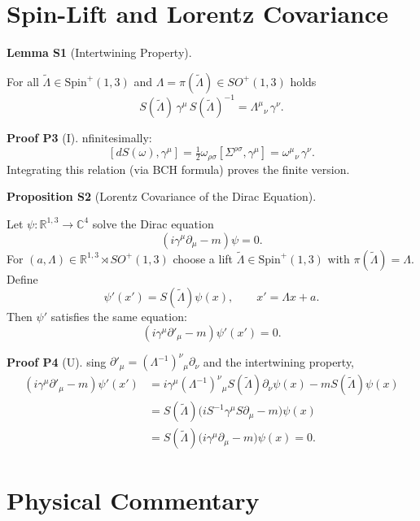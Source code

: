 \documentclass[10pt, letterpaper]{article}
\newcommand{\R}{\mathbb{R}}
\newcommand{\C}{\mathbb{C}}
\newcommand{\Spin}{\mathrm{Spin}}
\newcommand{\CustomHeading}[3]{%
  \par\medskip\noindent%
  \textbf{#1 #2} \textnormal{(#3)}.\enskip%
}
\newenvironment{PROP}[2]{\begin{unitbox}\CustomHeading{Proposition}{#1}{#2}}{\end{unitbox}}
\newenvironment{LEM}[2]{\begin{unitbox}\CustomHeading{Lemma}{#1}{#2}}{\end{unitbox}}
\newenvironment{PROOF}[2]{\begin{unitbox}\CustomHeading{Proof}{#1}{#2}}{\end{unitbox}}
\begin{document}
\section{Spin-Lift and Lorentz Covariance}

\begin{LEM}{S1}{Intertwining Property}
For all $\widetilde\Lambda\in \Spin^+(1,3)$ and $\Lambda=\pi(\widetilde\Lambda)\in SO^+(1,3)$ holds
\[
S(\widetilde\Lambda)\,\gamma^\mu\,S(\widetilde\Lambda)^{-1}
= \Lambda^\mu{}_\nu\,\gamma^\nu.
\]
\end{LEM}

\begin{PROOF}{P3}
Infinitesimally:
\[
[dS(\omega),\gamma^\mu]
= \tfrac12\omega_{\rho\sigma}[\Sigma^{\rho\sigma},\gamma^\mu]
= \omega^\mu{}_\nu\,\gamma^\nu.
\]
Integrating this relation (via BCH formula) proves the finite version.
\end{PROOF}

\begin{PROP}{S2}{Lorentz Covariance of the Dirac Equation}
Let $\psi:\R^{1,3}\to\C^4$ solve the Dirac equation
\[
(i\gamma^\mu\partial_\mu - m)\psi = 0.
\]
For $(a,\Lambda)\in \R^{1,3}\rtimes SO^+(1,3)$ choose a lift $\widetilde\Lambda\in\Spin^+(1,3)$ with $\pi(\widetilde\Lambda)=\Lambda$.  
Define
\[
\psi'(x') = S(\widetilde\Lambda)\psi(x),\qquad x'=\Lambda x + a.
\]
Then $\psi'$ satisfies the same equation:
\[
(i\gamma^\mu\partial'_\mu - m)\psi'(x')=0.
\]
\end{PROP}

\begin{PROOF}{P4}
Using $\partial'_\mu=(\Lambda^{-1})^\nu{}_\mu\partial_\nu$ and the intertwining property,
\[
\begin{aligned}
(i\gamma^\mu\partial'_\mu - m)\psi'(x')
&= i\gamma^\mu(\Lambda^{-1})^\nu{}_\mu S(\widetilde\Lambda)\partial_\nu\psi(x) - mS(\widetilde\Lambda)\psi(x)\\
&= S(\widetilde\Lambda)\big(iS^{-1}\gamma^\mu S\partial_\mu - m\big)\psi(x)\\
&= S(\widetilde\Lambda)\big(i\gamma^\mu\partial_\mu - m\big)\psi(x)=0.
\end{aligned}
\]
\end{PROOF}

\section{Physical Commentary}
\end{document}
